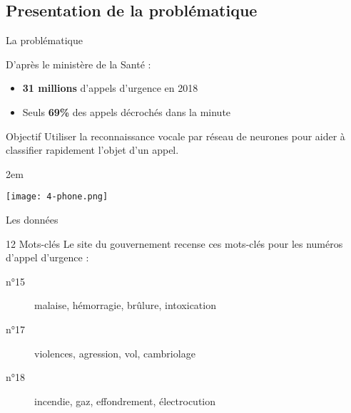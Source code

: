 \subsection{Presentation de la problématique}
\begin{frame}{La problématique}
    \begin{alertblock}{D'après le ministère de la Santé : }
        \begin{itemize}
            \item \textbf{31 millions} d'appels d'urgence en 2018
            \item Seuls \textbf{69\%} des appels décrochés dans la minute
        \end{itemize}
    \end{alertblock}
    \begin{block}{Objectif}
        Utiliser la reconnaissance vocale par réseau de neurones pour aider à classifier rapidement l'objet d'un appel.
    \end{block}
    \openup 2em
    \begin{center}
        \centering
        \texttt{[image: 4-phone.png]}
    \end{center}


\end{frame}


\begin{frame}{Les données}

	\begin{block}{12 Mots-clés}
		Le site du gouvernement recense ces mots-clés pour les numéros d'appel d'urgence : \\
		\begin{description}
			\item[n°15] malaise, hémorragie, brûlure, intoxication
			\item[n°17] violences, agression, vol, cambriolage
			\item[n°18] incendie, gaz, effondrement, électrocution
		\end{description}
	\end{block}

\end{frame}
